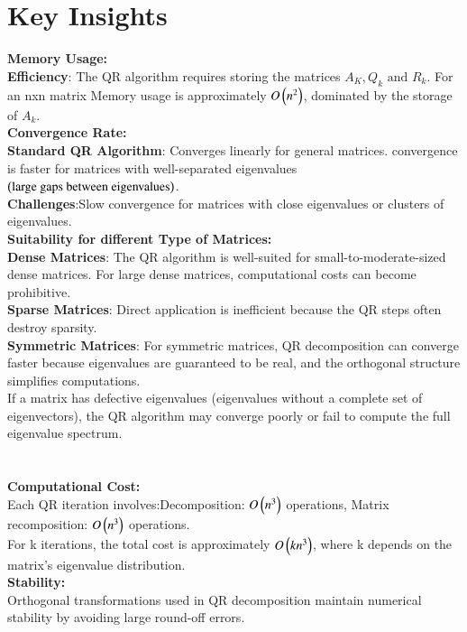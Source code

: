 \documentclass[journal]{IEEEtran}
\numberwithin{equation}{enumi}
\numberwithin{figure}{enumi}
\begin{document}
\section{\textbf{Key Insights}}
\textbf{Memory Usage:} \\
\textbf{Efficiency}: The QR algorithm requires storing the matrices $A_K, Q_k \text{ and } R_k$. For an nxn matrix Memory usage is approximately $O\left(n^2\right)$, dominated by the storage of $A_k$. 
\\
\textbf{Convergence Rate:} \\
\textbf{Standard QR Algorithm}: Converges linearly for general matrices. convergence is faster for matrices with well-separated eigenvalues $\left(\text{large gaps between eigenvalues}\right)$. \\
\textbf{Challenges}:Slow convergence for matrices with close eigenvalues or clusters of eigenvalues. \\
\textbf{Suitability for different Type of Matrices:} \\
\textbf{Dense Matrices}: The QR algorithm is well-suited for small-to-moderate-sized dense matrices. For large dense matrices, computational costs can become prohibitive. \\
\textbf{Sparse Matrices}: Direct application is inefficient because the QR steps often destroy sparsity. \\
\textbf{Symmetric Matrices}: For symmetric matrices, QR decomposition can converge faster because eigenvalues are guaranteed to be real, and the orthogonal structure simplifies computations. \\
If a matrix has defective eigenvalues (eigenvalues without a complete set of eigenvectors), the QR algorithm may converge poorly or fail to compute the full eigenvalue spectrum. \\ \\ \\
\textbf{Computational Cost:} \\
Each QR iteration involves:Decomposition: $O\left(n^3\right)$ operations, Matrix recomposition: $O\left(n^3\right)$ operations. \\
For k iterations, the total cost is approximately $O\left(kn^3\right)$, where k depends on the matrix's eigenvalue distribution.\\
\textbf{Stability:} \\
Orthogonal transformations used in QR decomposition maintain numerical stability by avoiding large round-off errors. \\
\end{document}
